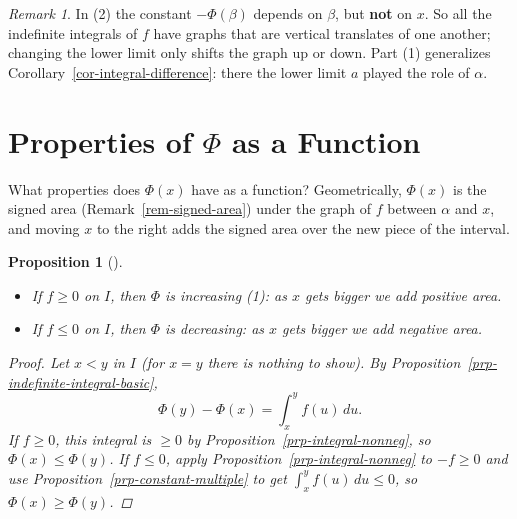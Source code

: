 \documentclass[
  letterpaper,
  DIV=11,
  numbers=noendperiod]{scrreprt}
\providecommand{\tightlist}{%
  \setlength{\itemsep}{0pt}\setlength{\parskip}{0pt}}
\theoremstyle{plain}
\theoremstyle{plain}
\newtheorem{proposition}{Proposition}[chapter]
\theoremstyle{definition}
\theoremstyle{definition}
\theoremstyle{definition}
\theoremstyle{plain}
\theoremstyle{plain}
\theoremstyle{remark}
\newtheorem{refremark}{Remark}[chapter]
\begin{document}
\begin{refremark}
In (2) the constant \(-\Phi(\beta)\) depends on \(\beta\), but
\textbf{not} on \(x\). So all the indefinite integrals of \(f\) have
graphs that are vertical translates of one another; changing the lower
limit only shifts the graph up or down. Part (1) generalizes
Corollary~\ref{cor-integral-difference}: there the lower limit \(a\)
played the role of \(\alpha\).

\label{rem-constant-is-fixed}

\end{refremark}

\section{\texorpdfstring{Properties of \(\Phi\) as a
Function}{Properties of \textbackslash Phi as a Function}}\label{properties-of-phi-as-a-function}

What properties does \(\Phi(x)\) have as a function? Geometrically,
\(\Phi(x)\) is the signed area (Remark~\ref{rem-signed-area}) under the
graph of \(f\) between \(\alpha\) and \(x\), and moving \(x\) to the
right adds the signed area over the new piece of the interval.

\begin{proposition}[]\protect\hypertarget{prp-indefinite-integral-monotone}{}\label{prp-indefinite-integral-monotone}

\hfill\break

\begin{itemize}
\tightlist
\item
  If \(f\ge 0\) on \(I\), then \(\Phi\) is increasing (1): as \(x\) gets
  bigger we add positive area.
\item
  If \(f\le 0\) on \(I\), then \(\Phi\) is decreasing: as \(x\) gets
  bigger we add negative area.
\end{itemize}

\begin{proof}
Let \(x<y\) in \(I\) (for \(x=y\) there is nothing to show). By
Proposition~\ref{prp-indefinite-integral-basic}, \[
\Phi(y) - \Phi(x) = \int_x^y f(u)\,du.
\] If \(f\ge 0\), this integral is \(\ge 0\) by
Proposition~\ref{prp-integral-nonneg}, so \(\Phi(x)\le\Phi(y)\). If
\(f\le 0\), apply Proposition~\ref{prp-integral-nonneg} to \(-f\ge0\)
and use Proposition~\ref{prp-constant-multiple} to get
\(\int_x^y f(u)\,du\le 0\), so \(\Phi(x)\ge\Phi(y)\).
\end{proof}

\end{proposition}
\end{document}
